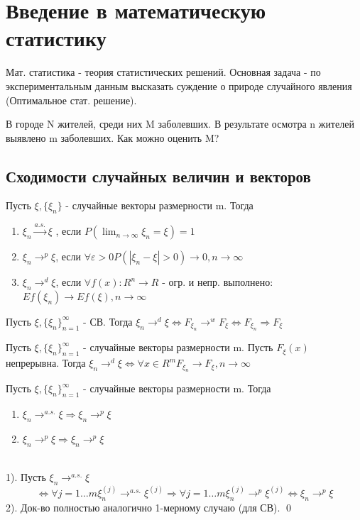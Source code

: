 	\section{Введение в математическую статистику}
	Мат. статистика - теория статистических решений.
	Основная задача - по экспериментальным данным высказать суждение о природе случайного явления (Оптимальное стат. решение).\\
	\begin{example}
		В городе N жителей, среди них M заболевших. В результате осмотра n жителей выявлено m заболевших. Как можно оценить M?
	\end{example}
	
	\subsection{Сходимости случайных величин и векторов}
	Пусть $\xi,\{\xi_n\}$ - случайные векторы размерности m. Тогда 
	\begin{enumerate}
		\item $\xi_n \xrightarrow{a.s.} \xi$ , если $P(\lim_{n\to\infty}\xi_n = \xi) = 1$
		\item $\xi_n \to^p \xi$, если $\forall \varepsilon > 0 P(|\xi_n - \xi| > 0) \to 0, n \to \infty$
		\item $\xi_n \to^d \xi$, если $\forall f(x):R^n\to R$ - огр. и непр. выполнено: $Ef(\xi_n) \to Ef(\xi), n \to\infty$
	\end{enumerate}
	
	\begin{theorem}
		Пусть $\xi, \{\xi_n\}_{n=1}^{\infty}$ - СВ.
		Тогда $\xi_n \to^d \xi \Leftrightarrow F_{\xi_n} \to^w F_\xi \Leftrightarrow F_{\xi_n} \Rightarrow F_\xi$ 
	\end{theorem}	
	
	\begin{theorem}
		Пусть $\xi, \{\xi_n\}_{n=1}^{\infty}$ - случайные векторы размерности m. Пусть $F_\xi(x)$ непрерывна. 
		Тогда $\xi_n \to^d \xi \Leftrightarrow \forall x \in R^m F_{\xi_n} \to F_\xi, n \to \infty$
	\end{theorem}
	
	\begin{theorem}
		Пусть $\xi, \{\xi_n\}_{n=1}^{\infty}$ - случайные векторы размерности m. Тогда
		\begin{enumerate}
			\item $\xi_n \to^{a.s.} \xi \Rightarrow \xi_n \to^p \xi$
			\item $\xi_n \to^p \xi \Rightarrow \xi_n \to^p \xi$
		\end{enumerate}
		\proof\\
		1). Пусть $\xi_n \to^{a.s.} \xi$ 
		$$ \Leftrightarrow \forall j=1\ldots m \xi_n^{(j)} \to^{a.s.} \xi^{(j)} \Rightarrow \forall j=1\ldots m \xi_n^{(j)} \to^p \xi^{(j)} \Leftrightarrow \xi_n \to^p \xi$$
		2). Док-во полностью аналогично 1-мерному случаю (для СВ).
		\qed
	\end{theorem}
	
